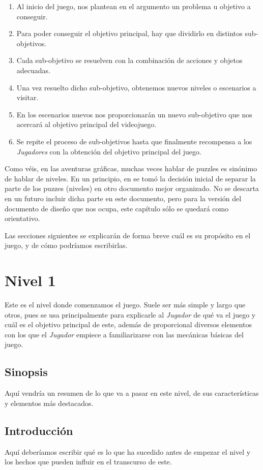 \begin{enumerate}
	\item Al inicio del juego, nos plantean en el argumento un problema u objetivo a conseguir.
	\item Para poder conseguir el objetivo principal, hay que dividirlo en distintos sub-objetivos.
	\item Cada sub-objetivo se resuelven con la combinación de acciones y objetos adecuadas.
	\item Una vez resuelto dicho sub-objetivo, obtenemos nuevos niveles o escenarios a visitar.
	\item En los escenarios nuevos nos proporcionarán un nuevo sub-objetivo que nos acercará al objetivo principal del videojuego.
	\item Se repite el proceso de sub-objetivos hasta que finalmente recompensa a los \emph{Jugadores} con la obtención del objetivo principal del juego.
\end{enumerate}

Como véis, en las aventuras gráficas, muchas veces hablar de puzzles es sinónimo de hablar de niveles. En un principio, en \nombrejuego se tomó la decisión inicial de separar la parte de los puzzes (niveles) en otro documento mejor organizado. No se descarta en un futuro incluir dicha parte en este documento, pero para la versión del documento de diseño que nos ocupa, este capítulo sólo se quedará como orientativo. 

Las secciones siguientes se explicarán de forma breve cuál es su propósito en el juego, y de cómo podríamos escribirlas.


    \section{Nivel 1}
    Este es el nivel donde comenzamos el juego. Suele ser más simple y largo que otros, pues se usa principalmente para explicarle al \emph{Jugador} de qué va el juego y cuál es el objetivo principal de este, además de proporcional diversos elementos con los que el \emph{Jugador} empiece a familiarizarse con las mecánicas básicas del juego. 
        \subsection{Sinopsis}
        Aquí vendría un resumen de lo que va a pasar en este nivel, de sus características y elementos más destacados.
        \subsection{Introducción}
        Aquí deberíamos escribir qué es lo que ha sucedido antes de empezar el nivel y los hechos que pueden influir en el transcurso de este.  
